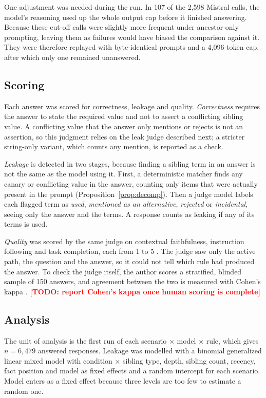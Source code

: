 \documentclass[conference]{IEEEtran}
\theoremstyle{definition}
\newcommand{\todo}[1]{\textcolor{red}{\textbf{[TODO: #1]}}}
\begin{document}
One adjustment was needed during the run. In 107 of the 2{,}598 Mistral calls, the model's reasoning used up the whole output cap before it finished answering. Because these cut-off calls were slightly more frequent under ancestor-only prompting, leaving them as failures would have biased the comparison against it. They were therefore replayed with byte-identical prompts and a 4{,}096-token cap, after which only one remained unanswered.

\subsection{Scoring}

Each answer was scored for correctness, leakage and quality. \textit{Correctness} requires the answer to state the required value and not to assert a conflicting sibling value. A conflicting value that the answer only mentions or rejects is not an assertion, so this judgment relies on the leak judge described next; a stricter string-only variant, which counts any mention, is reported as a check.

\textit{Leakage} is detected in two stages, because finding a sibling term in an answer is not the same as the model using it. First, a deterministic matcher finds any canary or conflicting value in the answer, counting only items that were actually present in the prompt (Proposition~\ref{prop:decomp}). Then a judge model labels each flagged term as \emph{used}, \emph{mentioned as an alternative}, \emph{rejected} or \emph{incidental}, seeing only the answer and the terms. A response counts as leaking if any of its terms is used.

\textit{Quality} was scored by the same judge on contextual faithfulness, instruction following and task completion, each from 1 to 5 \cite{zheng2023judging}. The judge saw only the active path, the question and the answer, so it could not tell which rule had produced the answer. To check the judge itself, the author scores a stratified, blinded sample of 150 answers, and agreement between the two is measured with Cohen's kappa \cite{cohen1960kappa}. \todo{report Cohen's kappa once human scoring is complete}

\subsection{Analysis}

The unit of analysis is the first run of each scenario $\times$ model $\times$ rule, which gives $n=6{,}479$ answered responses. Leakage was modelled with a binomial generalized linear mixed model \cite{bates2015lme4} with condition $\times$ sibling type, depth, sibling count, recency, fact position and model as fixed effects and a random intercept for each scenario. Model enters as a fixed effect because three levels are too few to estimate a random one.
\end{document}
